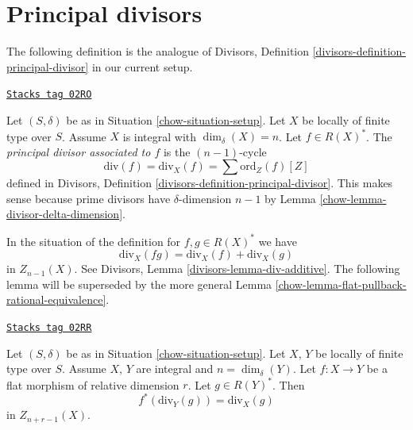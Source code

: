 \section{Principal divisors}
\label{chow-section-principal-divisors}
The following definition is the analogue of
Divisors, Definition \ref{divisors-definition-principal-divisor}
in our current setup.

\begin{definition}
\label{chow-definition-principal-divisor}
\href{https://stacks.math.columbia.edu/tag/02RO}{\texttt{Stacks tag 02RO}}

Let $(S, \delta)$ be as in Situation \ref{chow-situation-setup}.
Let $X$ be locally of finite type over $S$. Assume $X$ is
integral with $\dim_\delta(X) = n$.
Let $f \in R(X)^*$. The {\it principal divisor
associated to $f$} is the $(n - 1)$-cycle
$$
\text{div}(f) = \text{div}_X(f) = \sum \text{ord}_Z(f) [Z]
$$
defined in Divisors, Definition \ref{divisors-definition-principal-divisor}.
This makes sense because prime divisors have $\delta$-dimension $n - 1$ by
Lemma \ref{chow-lemma-divisor-delta-dimension}.
\end{definition}

In the situation of the definition for $f, g \in R(X)^*$ we have
$$
\text{div}_X(fg) = \text{div}_X(f) + \text{div}_X(g)
$$
in $Z_{n - 1}(X)$. See Divisors, Lemma \ref{divisors-lemma-div-additive}.
The following lemma will be superseded by the more general
Lemma \ref{chow-lemma-flat-pullback-rational-equivalence}.

\begin{lemma}
\label{chow-lemma-flat-pullback-principal-divisor}
\href{https://stacks.math.columbia.edu/tag/02RR}{\texttt{Stacks tag 02RR}}

Let $(S, \delta)$ be as in Situation \ref{chow-situation-setup}.
Let $X$, $Y$ be locally of finite type over $S$. Assume $X$, $Y$
are integral and $n = \dim_\delta(Y)$.
Let $f : X \to Y$ be a flat morphism of relative dimension $r$.
Let $g \in R(Y)^*$. Then
$$
f^*(\text{div}_Y(g)) = \text{div}_X(g)
$$
in $Z_{n + r - 1}(X)$.
\end{lemma}

